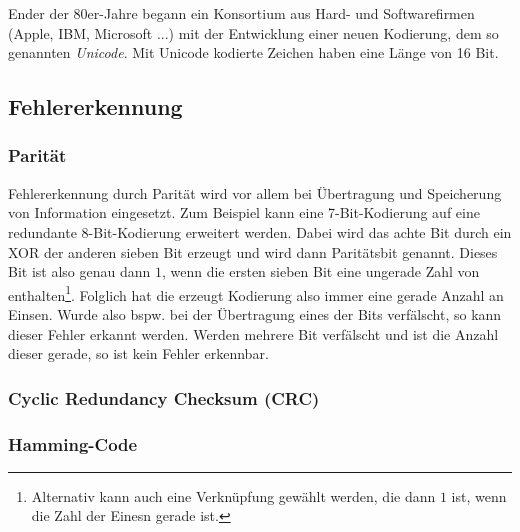 \documentclass[11pt]{article}
\begin{document}
Ender der 80er-Jahre begann ein Konsortium aus Hard- und Softwarefirmen (Apple, IBM, Microsoft ...) mit der Entwicklung einer neuen Kodierung, dem so genannten \textit{Unicode}. Mit Unicode kodierte Zeichen haben eine Länge von 16 Bit.

\subsection{Fehlererkennung}
\subsubsection{Parität}
Fehlererkennung durch Parität wird vor allem bei Übertragung und Speicherung von Information eingesetzt. Zum Beispiel kann eine 7-Bit-Kodierung auf eine redundante 8-Bit-Kodierung erweitert werden. Dabei wird das achte Bit durch ein XOR der anderen sieben Bit erzeugt und wird dann Paritätsbit genannt. Dieses Bit ist also genau dann \(1\), wenn die ersten sieben Bit eine ungerade Zahl von enthalten\footnote{Alternativ kann auch eine Verknüpfung gewählt werden, die dann \(1\) ist, wenn die Zahl der Einesn gerade ist.}. Folglich hat die erzeugt Kodierung also immer eine gerade Anzahl an Einsen.
Wurde also bspw. bei der Übertragung eines der Bits verfälscht, so kann dieser Fehler erkannt werden. Werden mehrere Bit verfälscht und ist die Anzahl dieser gerade, so ist kein Fehler erkennbar.
\subsubsection{Cyclic Redundancy Checksum (CRC)}

\subsubsection{Hamming-Code}
\end{document}
